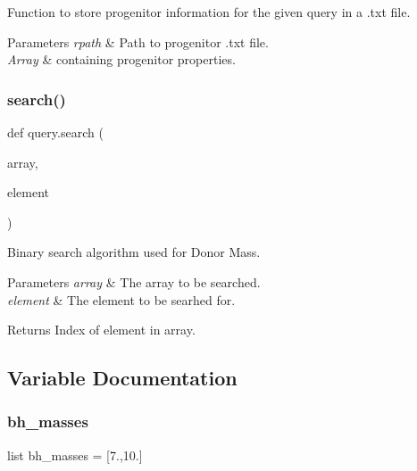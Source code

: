 Function to store progenitor information for the given query in a .txt file. 


\begin{DoxyParams}{Parameters}
{\em rpath} & Path to progenitor .txt file. \\
\hline
{\em Array} & containing progenitor properties. \\
\hline
\end{DoxyParams}
\mbox{\label{namespacequery_a631cedf881e24bf0a12fc4031158e804}} 
\subsubsection{\texorpdfstring{search()}{search()}}
{\footnotesize\ttfamily def query.\+search (\begin{DoxyParamCaption}\item[{}]{array,  }\item[{}]{element }\end{DoxyParamCaption})}



Binary search algorithm used for Donor Mass. 


\begin{DoxyParams}{Parameters}
{\em array} & The array to be searched. \\
\hline
{\em element} & The element to be searhed for. \\
\hline
\end{DoxyParams}
\begin{DoxyReturn}{Returns}
Index of element in array. 
\end{DoxyReturn}


\subsection{Variable Documentation}
\mbox{\label{namespacequery_aef6e5a079f78ef199b5c8c5e8018138c}} 
\subsubsection{\texorpdfstring{bh\+\_\+masses}{bh\_masses}}
{\footnotesize\ttfamily list bh\+\_\+masses = \mbox{[}7.,10.\mbox{]}}

\mbox{\label{namespacequery_aca5011236a28a00635a5bfdc3b7df6f6}} 
